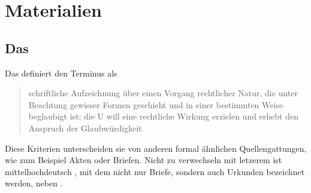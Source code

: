 \chapter{Materialien}
\label{ch:materialien}

\section%
	{Das }
\label{sec:materialcao}

Das  definiert den Terminus
 als \blockcquote[574]{frenz1998a}{schriftliche Aufzeichnung über
einen Vorgang rechtlicher Natur, die unter Beachtung gewisser Formen geschieht
und in einer bestimmten Weise beglaubigt ist; die U will eine
rechtliche Wirkung erzielen und erhebt den Anspruch der Glaubwürdigkeit}.

Diese Kriterien unterscheiden sie von anderen formal ähnlichen
Quellengattungen, wie zum Beispiel Akten oder Briefen. Nicht zu verwechseln mit
letzerem ist mittelhochdeutsch , mit dem
nicht nur Briefe, sondern auch Urkunden bezeichnet werden, neben
\autocites[][s.\,v.~]{mwb1}[][s.\,v.~]{mwb2}[vgl.
auch][]{schmidtwiegand1998a}.

